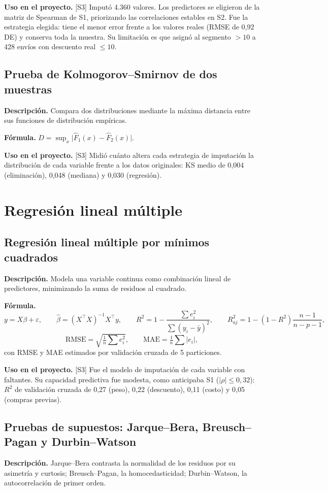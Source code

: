 \documentclass[11pt,a4paper]{article}
\newcommand{\desc}{\textbf{Descripción.} }
\newcommand{\formula}{\textbf{Fórmula.} }
\newcommand{\uso}{\textbf{Uso en el proyecto.} }
\newcommand{\fase}[1]{{\footnotesize\color{gris}[#1]}}
\begin{document}
\uso \fase{S3} Imputó 4.360 valores. Los predictores se eligieron de la matriz de Spearman de S1, priorizando las correlaciones estables en S2. Fue la estrategia elegida: tiene el menor error frente a los valores reales (RMSE de 0,92 DE) y conserva toda la muestra. Su limitación es que asignó al segmento $>10$ a 428 envíos con descuento real $\le10$.

\subsection{Prueba de Kolmogorov--Smirnov de dos muestras}
\desc Compara dos distribuciones mediante la máxima distancia entre sus funciones de distribución empíricas.

\formula $D=\sup_x\big|\hat F_1(x)-\hat F_2(x)\big|$.

\uso \fase{S3} Midió cuánto altera cada estrategia de imputación la distribución de cada variable frente a los datos originales: KS medio de 0,004 (eliminación), 0,048 (mediana) y 0,030 (regresión).

\section{Regresión lineal múltiple}\label{sec:lineal}

\subsection{Regresión lineal múltiple por mínimos cuadrados}
\desc Modela una variable continua como combinación lineal de predictores, minimizando la suma de residuos al cuadrado.

\formula
\[
y=X\beta+\varepsilon,\qquad \hat\beta=(X^\top X)^{-1}X^\top y,\qquad R^2=1-\frac{\sum e_i^2}{\sum(y_i-\bar y)^2},\qquad R^2_{aj}=1-(1-R^2)\frac{n-1}{n-p-1},
\]
\[
\mathrm{RMSE}=\sqrt{\tfrac1n\textstyle\sum e_i^2},\qquad \mathrm{MAE}=\tfrac1n\textstyle\sum|e_i| ,
\]
con RMSE y MAE estimados por validación cruzada de 5 particiones.

\uso \fase{S3} Fue el modelo de imputación de cada variable con faltantes. Su capacidad predictiva fue modesta, como anticipaba S1 ($|\rho|\le0{,}32$): $R^2$ de validación cruzada de 0,27 (peso), 0,22 (descuento), 0,11 (costo) y 0,05 (compras previas).

\subsection{Pruebas de supuestos: Jarque--Bera, Breusch--Pagan y Durbin--Watson}
\desc Jarque--Bera contrasta la normalidad de los residuos por su asimetría y curtosis; Breusch--Pagan, la homocedasticidad; Durbin--Watson, la autocorrelación de primer orden.
\end{document}
